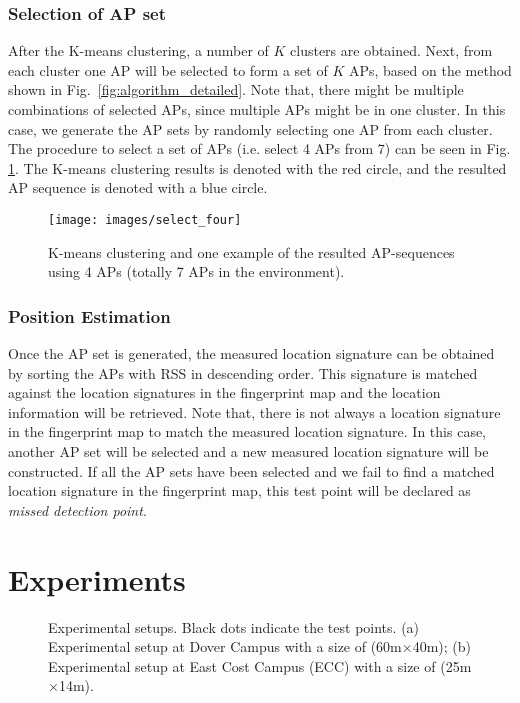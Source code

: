 \documentclass[10pt, conference, letterpaper]{IEEEtran}
\begin{document}
\subsubsection{Selection of AP set}
After the K-means clustering, a number of $K$ clusters are obtained. 
Next, from each cluster one AP will be selected to form a set of $K$ APs, based on the method shown in Fig.~\ref{fig:algorithm_detailed}. 
Note that, there might be multiple combinations of selected APs, since multiple APs might be in one cluster. 
In this case, we generate the AP sets by randomly selecting one AP from each cluster. 
The procedure to select a set of APs (i.e. select 4 APs from 7) can be seen in Fig. \ref{fig:select_four}. 
The K-means clustering results is denoted with the red circle, and the resulted AP sequence is denoted with a blue circle.\begin{figure}
\centering
\texttt{[image: images/select\_four]}
\caption{K-means clustering and one example of the resulted AP-sequences using 4 APs (totally 7 APs in the environment).}
\label{fig:select_four}
\vspace{-0.1in}
\end{figure}

\subsubsection{Position Estimation}
Once the AP set is generated, the measured location signature can be obtained by sorting the APs with RSS in descending order. 
This signature is matched against the location signatures in the fingerprint map and the location information will be retrieved. 
Note that, there is not always a location signature in the fingerprint map to match the measured location signature. 
In this case, another AP set will be selected and a new measured location signature will be constructed. 
If all the AP sets have been selected and we fail to find a matched location signature in the fingerprint map, this test point will be declared as \emph{missed detection point}.

\vspace{-0.1in}
\section{Experiments}
\label{section:experimental_results}
\begin{figure}
  \centering
   \caption[Experimental setups]{Experimental setups. Black dots indicate the test points. 
(a) Experimental setup at Dover Campus with a size of (60m$\times$40m);
(b) Experimental setup at East Cost Campus (ECC) with a size of (25m$\times$14m).}
\label{fig:experimental_setups}
\vspace{-0.1in}
\end{figure}
\end{document}

